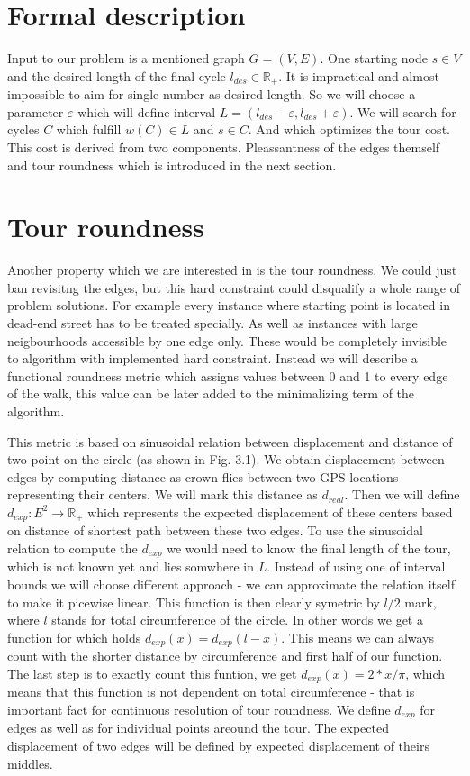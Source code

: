 \documentclass{ctuthesis}
\begin{document}
\section{Formal description}
Input to our problem is a mentioned graph \(G=(V, E)\). One starting node \(s \in V\) and the desired length of the final cycle \(l_{des} \in \mathbb{R_+}\). It is impractical and almost impossible to aim for single number as desired length. So we will choose a parameter \(\varepsilon\) which will define interval \(L = (l_{des}-\varepsilon, l_{des}+\varepsilon)\). We will search for cycles \(C\) which fulfill \(w(C) \in L\) and \(s \in C\). And which optimizes the tour cost. This cost is derived from two components. Pleassantness of the edges themself and tour roundness which is introduced in the next section.
	
\section{Tour roundness}
Another property which we are interested in is the tour roundness. We could just ban revisitng the edges, but this hard constraint could disqualify a whole range of problem solutions. For example every instance where starting point is located in dead-end street has to be treated specially. As well as instances with large neigbourhoods accessible by one edge only. These would be completely invisible to algorithm with implemented hard constraint. Instead we will describe a functional roundness metric which assigns values between 0 and 1 to every edge of the walk, this value can be later added to the minimalizing term of the algorithm.\par
This metric is based on sinusoidal relation between displacement and distance of two point on the circle (as shown in Fig. 3.1). We obtain displacement between edges by computing distance as crown flies between two GPS locations representing their centers. We will mark this distance as \(d_{real}\). Then we will define \(d_{exp}: E^2 \rightarrow \mathbb{R_+}\) which represents the expected displacement of these centers based on distance of shortest path between these two edges. To use the sinusoidal relation to compute the \(d_{exp}\) we would need to know the final length of the tour, which is not known yet and lies somwhere in \(L\). Instead of using one of interval bounds we will choose different approach - we can approximate the relation itself to make it picewise linear. This function is then clearly symetric by \(l/2\) mark, where \(l\) stands for total circumference of the circle. In other words we get a function for which holds \(d_{exp}(x) = d_{exp}(l-x)\). This means we can always count with the shorter distance by circumference and first half of our function. The last step is to exactly count this funtion, we get \(d_{exp}(x)=2*x/{\pi}\), which means that this function is not dependent on total circumference - that is important fact for continuous resolution of tour roundness.
We define \(d_{exp}\) for edges as well as for individual points areound the tour. The expected displacement of two edges will be defined by expected displacement of theirs middles.
\end{document}
